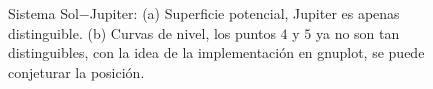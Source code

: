 \begin{figure}[H]
\centering
{} \qquad \qquad
{}
\caption{Sistema Sol$-$Jupiter: (a) Superficie potencial, Jupiter es apenas distinguible. (b) Curvas de nivel, los puntos $4$ y $5$ ya no son tan distinguibles, con la idea de la implementación en gnuplot, se puede conjeturar la posición.}
\label{superficie, cn s-j, math}
\end{figure}

